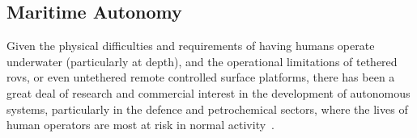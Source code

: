 \subsection{Maritime Autonomy}

Given the physical difficulties and requirements of having humans operate underwater (particularly at depth), and the operational limitations of tethered \glspl{rov}, or even untethered remote controlled surface platforms, there has been a great deal of research and commercial interest in the development of autonomous systems, particularly in the defence and petrochemical sectors, where the lives of human operators are most at risk in normal activity~\cite{Pechoucek:2008:DIA:1355335}.

\begin{table}\centering
	

\end{table}
